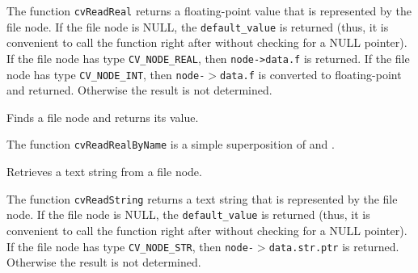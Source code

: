 The function \texttt{cvReadReal} returns a floating-point value
that is represented by the file node. If the file node is NULL, the
\texttt{default\_value} is returned (thus, it is convenient to call
the function right after  without checking for a NULL
pointer). If the file node has type \texttt{CV\_NODE\_REAL},
then \texttt{node->data.f} is returned. If the file node has type
\texttt{CV\_NODE\_INT}, then \texttt{node-$>$data.f} is converted to floating-point
and returned. Otherwise the result is not determined.

\label{ReadRealByName}

Finds a file node and returns its value.


\begin{description}
\end{description}

The function \texttt{cvReadRealByName} is a simple superposition of  and .

\label{ReadString}

Retrieves a text string from a file node.


\begin{description}
\end{description}

The function \texttt{cvReadString} returns a text string that is represented
by the file node. If the file node is NULL, the \texttt{default\_value}
is returned (thus, it is convenient to call the function right after
 without checking for a NULL pointer). If
the file node has type \texttt{CV\_NODE\_STR}, then \texttt{node-$>$data.str.ptr}
is returned. Otherwise the result is not determined.

